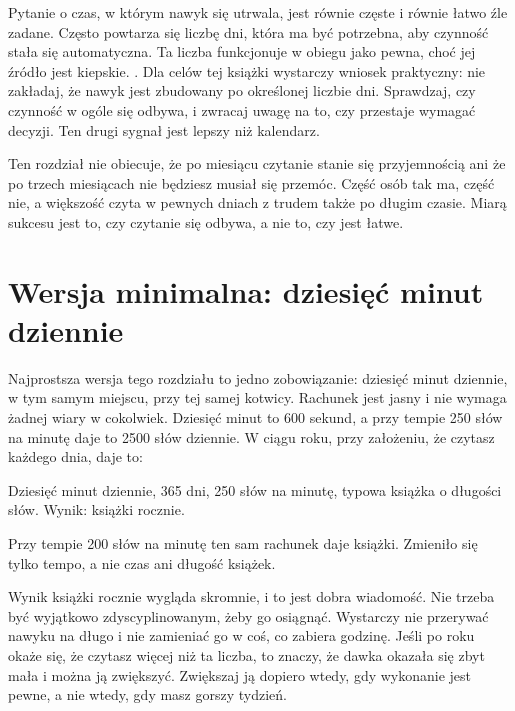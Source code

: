 Pytanie o czas, w którym nawyk się utrwala, jest równie częste i równie łatwo źle zadane. Często powtarza się liczbę dni, która ma być potrzebna, aby czynność stała się automatyczna. Ta liczba funkcjonuje w obiegu jako pewna, choć jej źródło jest kiepskie. . Dla celów tej książki wystarczy wniosek praktyczny: nie zakładaj, że nawyk jest zbudowany po określonej liczbie dni. Sprawdzaj, czy czynność w ogóle się odbywa, i zwracaj uwagę na to, czy przestaje wymagać decyzji. Ten drugi sygnał jest lepszy niż kalendarz.

\begin{uwaga}
  Ten rozdział nie obiecuje, że po miesiącu czytanie stanie się przyjemnością ani że po trzech miesiącach nie będziesz musiał się przemóc. Część osób tak ma, część nie, a większość czyta w pewnych dniach z trudem także po długim czasie. Miarą sukcesu jest to, czy czytanie się odbywa, a nie to, czy jest łatwe.
\end{uwaga}

\section{Wersja minimalna: dziesięć minut dziennie}

Najprostsza wersja tego rozdziału to jedno zobowiązanie: dziesięć minut dziennie, w tym samym miejscu, przy tej samej kotwicy. Rachunek jest jasny i nie wymaga żadnej wiary w cokolwiek. Dziesięć minut to 600 sekund, a przy tempie 250 słów na minutę daje to 2500 słów dziennie. W ciągu roku, przy założeniu, że czytasz każdego dnia, daje to:

\begin{przyklad}
  Dziesięć minut dziennie, 365 dni, 250 słów na minutę, typowa książka o długości  słów. Wynik:  książki rocznie.

  Przy tempie 200 słów na minutę ten sam rachunek daje  książki. Zmieniło się tylko tempo, a nie czas ani długość książek.
\end{przyklad}

Wynik  książki rocznie wygląda skromnie, i to jest dobra wiadomość. Nie trzeba być wyjątkowo zdyscyplinowanym, żeby go osiągnąć. Wystarczy nie przerywać nawyku na długo i nie zamieniać go w coś, co zabiera godzinę. Jeśli po roku okaże się, że czytasz więcej niż ta liczba, to znaczy, że dawka okazała się zbyt mała i można ją zwiększyć. Zwiększaj ją dopiero wtedy, gdy wykonanie jest pewne, a nie wtedy, gdy masz gorszy tydzień.

